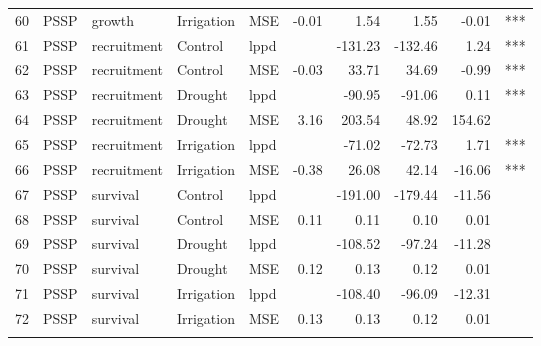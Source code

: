 \begin{longtable}{rllllrrrrl}
  60 & PSSP & growth & Irrigation & MSE & -0.01 & 1.54 & 1.55 & -0.01 & *** \\ 
  61 & PSSP & recruitment & Control & lppd &  & -131.23 & -132.46 & 1.24 & *** \\ 
  62 & PSSP & recruitment & Control & MSE & -0.03 & 33.71 & 34.69 & -0.99 & *** \\ 
  63 & PSSP & recruitment & Drought & lppd &  & -90.95 & -91.06 & 0.11 & *** \\ 
  64 & PSSP & recruitment & Drought & MSE & 3.16 & 203.54 & 48.92 & 154.62 &  \\ 
  65 & PSSP & recruitment & Irrigation & lppd &  & -71.02 & -72.73 & 1.71 & *** \\ 
  66 & PSSP & recruitment & Irrigation & MSE & -0.38 & 26.08 & 42.14 & -16.06 & *** \\ 
  67 & PSSP & survival & Control & lppd &  & -191.00 & -179.44 & -11.56 &  \\ 
  68 & PSSP & survival & Control & MSE & 0.11 & 0.11 & 0.10 & 0.01 &  \\ 
  69 & PSSP & survival & Drought & lppd &  & -108.52 & -97.24 & -11.28 &  \\ 
  70 & PSSP & survival & Drought & MSE & 0.12 & 0.13 & 0.12 & 0.01 &  \\ 
  71 & PSSP & survival & Irrigation & lppd &  & -108.40 & -96.09 & -12.31 &  \\ 
  72 & PSSP & survival & Irrigation & MSE & 0.13 & 0.13 & 0.12 & 0.01 &  \\ 
  \hline
\label{table:treatmentPreds}
\end{longtable}
